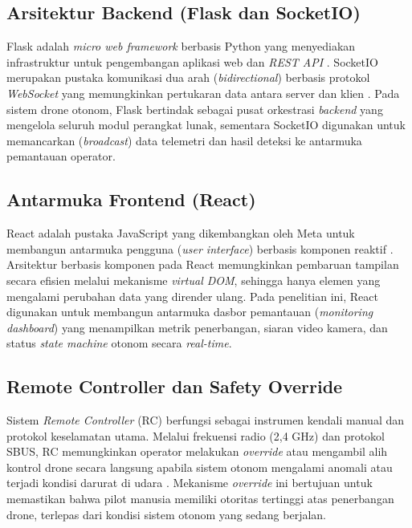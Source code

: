 \subsection{Arsitektur Backend (Flask dan SocketIO)}
Flask adalah \textit{micro web framework} berbasis Python yang menyediakan infrastruktur untuk pengembangan aplikasi web dan \textit{REST API} \cite{Flask2024}. SocketIO merupakan pustaka komunikasi dua arah (\textit{bidirectional}) berbasis protokol \textit{WebSocket} yang memungkinkan pertukaran data antara server dan klien \cite{SocketIO2024, Fette2011WebSocket}. Pada sistem drone otonom, Flask bertindak sebagai pusat orkestrasi \textit{backend} yang mengelola seluruh modul perangkat lunak, sementara SocketIO digunakan untuk memancarkan (\textit{broadcast}) data telemetri dan hasil deteksi ke antarmuka pemantauan operator.

\subsection{Antarmuka Frontend (React)}
React adalah pustaka JavaScript yang dikembangkan oleh Meta untuk membangun antarmuka pengguna (\textit{user interface}) berbasis komponen reaktif \cite{React2024}. Arsitektur berbasis komponen pada React memungkinkan pembaruan tampilan secara efisien melalui mekanisme \textit{virtual DOM}, sehingga hanya elemen yang mengalami perubahan data yang dirender ulang. Pada penelitian ini, React digunakan untuk membangun antarmuka dasbor pemantauan (\textit{monitoring dashboard}) yang menampilkan metrik penerbangan, siaran video kamera, dan status \textit{state machine} otonom secara \textit{real-time}.

\subsection{Remote Controller dan Safety Override}
Sistem \textit{Remote Controller} (RC) berfungsi sebagai instrumen kendali manual dan protokol keselamatan utama. Melalui frekuensi radio (2,4 GHz) dan protokol SBUS, RC memungkinkan operator melakukan \textit{override} atau mengambil alih kontrol drone secara langsung apabila sistem otonom mengalami anomali atau terjadi kondisi darurat di udara \cite{Austin2021}. Mekanisme \textit{override} ini bertujuan untuk memastikan bahwa pilot manusia memiliki otoritas tertinggi atas penerbangan drone, terlepas dari kondisi sistem otonom yang sedang berjalan.